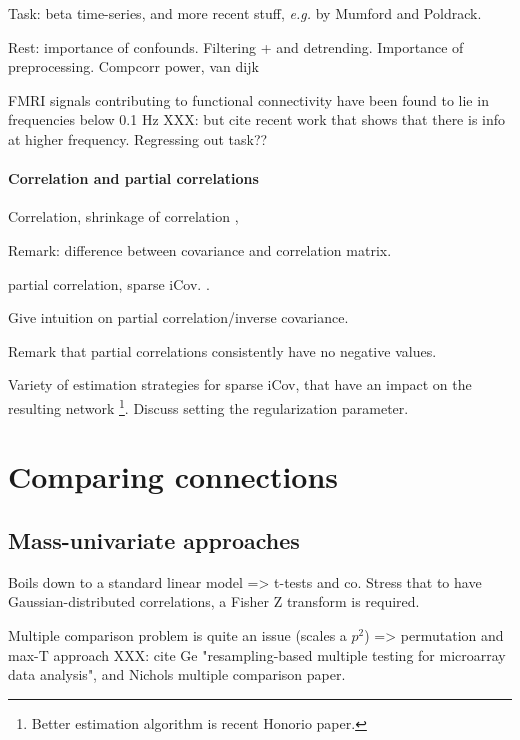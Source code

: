 \documentclass[5p]{elsarticle}
\begin{document}
Task: beta time-series, and more recent stuff, \emph{e.g.} by Mumford and
Poldrack.

Rest: importance of confounds. Filtering + and detrending. Importance of
preprocessing.
Compcorr \cite{behzadi2007}
\cite{chai2011}
power, van dijk
\cite{satterthwaite2012}

FMRI signals contributing to functional connectivity
have been found to lie in frequencies below 0.1 Hz \cite{cordes2000}
XXX: but cite recent work that shows that there is info at higher
frequency.  Regressing out task??

\paragraph{Correlation and partial correlations}

Correlation, shrinkage of correlation \cite{ledoit2004,varoquaux2012},

Remark: difference between covariance and correlation matrix.

partial correlation, sparse iCov. \cite{smith2011,varoquaux2010b}. 

Give intuition on partial correlation/inverse covariance.

Remark that partial correlations consistently have no negative values.

Variety
of estimation strategies for sparse iCov, that have an impact on the
resulting network \cite{varoquaux2012}\footnote{Better estimation
algorithm is recent Honorio paper.}. Discuss setting the regularization
parameter.


\section{Comparing connections}

\subsection{Mass-univariate approaches}

Boils down to a standard linear model => t-tests and co.
Stress that to have Gaussian-distributed correlations, a Fisher Z
transform is required.

Multiple comparison problem is quite an issue (scales a $p^2$) =>
permutation and max-T approach XXX: cite Ge
"resampling-based multiple testing for microarray data analysis", and
Nichols multiple comparison paper.
\end{document}
